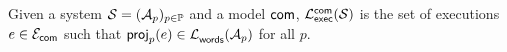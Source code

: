 



\begin{definition}
\label{def:executions-of-cfsms}
Given a system $\cfsms=(\acfsm_p)_{p\in\Procs}$ and a 
model $\acommunicationmodel$,  
$\executionsofcfsms{\cfsms}{\acommunicationmodel}$ is the set of 
executions $e \in \executionsofmodel{\acommunicationmodel}$ such that  
$\projofon{e}{p}\in\languageofnfa{\acfsm_p}$ for all $p$.  
\end{definition}

